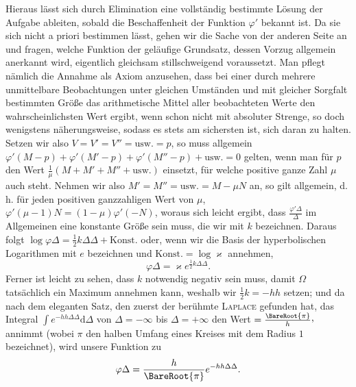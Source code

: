 Hieraus lässt sich durch Elimination eine vollständig bestimmte Lösung der Aufgabe ableiten, sobald die Beschaffenheit der Funktion $\varphi'$ bekannt ist. Da sie sich nicht a priori bestimmen lässt, gehen wir die Sache von der anderen Seite an und fragen, welche Funktion der geläufige Grundsatz, dessen Vorzug allgemein anerkannt wird, eigentlich gleichsam stillschweigend voraussetzt. Man pflegt nämlich die Annahme als Axiom anzusehen, dass bei einer durch mehrere unmittelbare Beobachtungen unter gleichen Umständen und mit gleicher Sorgfalt bestimmten Größe das arithmetische Mittel aller beobachteten Werte den wahrscheinlichsten Wert ergibt, wenn schon nicht mit absoluter Strenge, so doch wenigstens näherungsweise, sodass es stets am sichersten ist, sich daran zu halten. Setzen wir also $V=V'=V''=\text{usw.}=p$, so muss allgemein $\varphi'(M-p)+\varphi'(M'-p)+\varphi'(M''-p)+\text{usw.}=0$ gelten, wenn man für $p$ den Wert $\frac{1}{\mu}(M+M'+M''+\text{usw.})$ einsetzt, für welche positive ganze Zahl $\mu$ auch steht. Nehmen wir also $M'=M''=\text{usw.}=M-\mu N$ an, so gilt allgemein, d.\,h. für jeden positiven ganzzahligen Wert von $\mu$, $\varphi'(\mu-1)N=(1-\mu)\varphi'(-N)$, woraus sich leicht ergibt, dass $\frac{\varphi'\Delta}{\Delta}$ im Allgemeinen eine konstante Größe sein muss, die wir mit $k$ bezeichnen. Daraus folgt $\log\varphi\Delta=\tfrac12 k\Delta\Delta+\text{Konst.}$ oder, wenn wir die Basis der hyperbolischen Logarithmen mit $e$ bezeichnen und $\text{Konst.}=\log\varkappa$ annehmen,
\[
\varphi\Delta=\varkappa e^{\frac12 k\Delta\Delta}.
\]
Ferner ist leicht zu sehen, dass $k$ notwendig negativ sein muss, damit $\Omega$ tatsächlich ein Maximum annehmen kann, weshalb wir $\tfrac12 k=-hh$ setzen; und da nach dem eleganten Satz, den zuerst der berühmte \textsc{Laplace} gefunden hat, das Integral $\int e^{-hh\Delta\Delta}\mathrm{d}\Delta$ von $\Delta=-\infty$ bis $\Delta=+\infty$ den Wert $=\frac{\BareRoot{\pi}}{h}\mathpunct{\raisebox{.45ex}{,}}$ annimmt (wobei $\pi$ den halben Umfang eines Kreises mit dem Radius $1$ bezeichnet), wird unsere Funktion zu
\[
\varphi\Delta=\frac{h}{\BareRoot{\pi}}e^{-hh\Delta\Delta}.
\]
